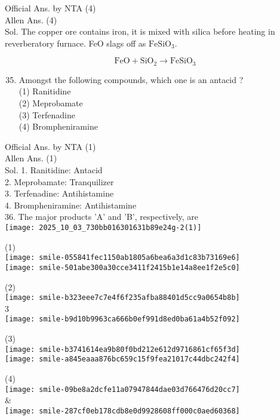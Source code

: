 \documentclass[10pt]{article}
\begin{document}
Official Ans. by NTA (4)\\
Allen Ans. (4)\\
Sol. The copper ore contains iron, it is mixed with silica before heating in reverberatory furnace. FeO slags off as \(\mathrm{FeSiO}_{3}\).

\[
\mathrm{FeO}+\mathrm{SiO}_{2} \longrightarrow \mathrm{FeSiO}_{3}
\]

\begin{enumerate}
  \setcounter{enumi}{34}
  \item Amongst the following compounds, which one is an antacid ?\\
(1) Ranitidine\\
(2) Meprobamate\\
(3) Terfenadine\\
(4) Brompheniramine
\end{enumerate}

Official Ans. by NTA (1)\\
Allen Ans. (1)\\
Sol. 1. Ranitidine: Antacid\\
2. Meprobamate: Tranquilizer\\
3. Terfenadine: Antihistamine\\
4. Brompheniramine: Antihistamine\\
36. The major products 'A' and 'B', respectively, are\\
\texttt{[image: 2025\_10\_03\_730bb016301631b89e24g-2(1)]}

(1)\\
\texttt{[image: smile-055841fec1150ab1805a6bea6a3d1c83b73169e6]}\\
\texttt{[image: smile-501abe300a30cce3411f2415b1e14a8ee1f2e5c0]}

(2)\\
\texttt{[image: smile-b323eee7c7e4f6f235afba88401d5cc9a0654b8b]}\\
3\\
\texttt{[image: smile-b9d10b9963ca666b0ef991d8ed0ba61a4b52f092]}

(3)\\
\texttt{[image: smile-b3741614ea9b80f0bd212e612d9716861cf65f3d]}\\
\texttt{[image: smile-a845eaaa876bc659c15f9fea21017c44dbc242f4]}

(4)\\
\texttt{[image: smile-09be8a2dcfe11a07947844dae03d766476d20cc7]}\\
\&\\
\texttt{[image: smile-287cf0eb178cdb8e0d9928608ff000c0aed60368]}
\end{document}
